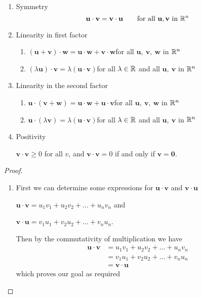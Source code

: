 \documentclass[10pt, a4paper]{article}
\newcommand{\mbf}[1]{\mathbf{#1}}
\begin{document}
\begin{proposition}
\phantom{}
\begin{enumerate}[label = (\roman*)]
    \item Symmetry
    \[
    \mbf{u \cdot v = v \cdot u}\qquad\text{for all }\mbf{u, v}\text{ in } \R ^ n
    \]
    \item Linearity in first factor
    \begin{enumerate}[label = (\alph*)]
        \item $(\mbf{u} + \mbf{v}) \cdot \mbf{w} = \mbf{u} \cdot \mbf{w} + \mbf{v} \cdot \mbf{w}$\qquad for all $\mbf{u,\ v,\ w}$ in $\mathbb{R} ^ n$
        \item $(\lambda\mbf{u}) \cdot \mbf{v} = \lambda(\mbf{u} \cdot \mbf{v})$\qquad for all $\lambda \in \mathbb{R}$ and all $\mbf{u,\ v}$ in $\mathbb{R} ^ n$
    \end{enumerate}
    \item Linearity in the second factor
    \begin{enumerate}[label = (\alph*)]
        \item $\mbf{u} \cdot (\mbf{v} + \mbf{w}) = \mbf{u} \cdot \mbf{w} + \mbf{u} \cdot \mbf{v}$\qquad for all $\mbf{u,\ v,\ w}$ in $\mathbb{R} ^ n$
        \item $\mbf{u} \cdot (\lambda\mbf{v}) = \lambda(\mbf{u} \cdot \mbf{v})$\qquad for all $\lambda \in \mathbb{R}$ and all $\mbf{u,\ v}$ in $\mathbb{R} ^ n$
    \end{enumerate}
    \item Positivity
    
    $\mbf{v \cdot v} \geq 0$ for all $v$, and $\mbf{v \cdot v} = 0$ if and only if $\mbf{v = 0}$.
\end{enumerate}

\begin{proof}
    \phantom{}
    \begin{enumerate}[label = (\roman*)]
        \item
        First we can determine some expressions for $\mbf{u\cdot v}$ and $\mbf{v\cdot u}$
        
        $\mbf{u\cdot v} = u_1 v_1 + u_2 v_2 + \dotsc + u_n v_n$ and

        $\mbf{v\cdot u} = v_1 u_1 + v_2 u_2 + \dotsc + v_n u_n$.

        Then by the commutativity of multiplication we have
        \begin{align*}
            \mbf{u\cdot v} &= u_1 v_1 + u_2 v_2 + \dotsc + u_n v_n \\
            &= v_1 u_1 + v_2 u_2 + \dotsc + v_n u_n \\
            &= \mbf{v \cdot u}
        \end{align*}
        which proves our goal as required
        
    \end{enumerate}
\end{proof}
\end{proposition}
\end{document}

